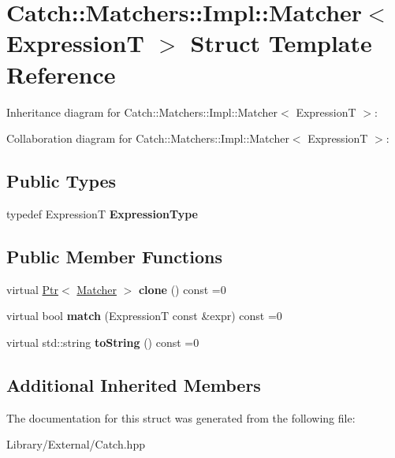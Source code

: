 \hypertarget{struct_catch_1_1_matchers_1_1_impl_1_1_matcher}{}\section{Catch\+:\+:Matchers\+:\+:Impl\+:\+:Matcher$<$ Expression\+T $>$ Struct Template Reference}
\label{struct_catch_1_1_matchers_1_1_impl_1_1_matcher}


Inheritance diagram for Catch\+:\+:Matchers\+:\+:Impl\+:\+:Matcher$<$ Expression\+T $>$\+:


Collaboration diagram for Catch\+:\+:Matchers\+:\+:Impl\+:\+:Matcher$<$ Expression\+T $>$\+:
\subsection*{Public Types}
\begin{DoxyCompactItemize}
\item 
\hypertarget{struct_catch_1_1_matchers_1_1_impl_1_1_matcher_a7f5068cbacd1eed06cf243e63446e7e1}{}typedef Expression\+T {\bfseries Expression\+Type}\label{struct_catch_1_1_matchers_1_1_impl_1_1_matcher_a7f5068cbacd1eed06cf243e63446e7e1}

\end{DoxyCompactItemize}
\subsection*{Public Member Functions}
\begin{DoxyCompactItemize}
\item 
\hypertarget{struct_catch_1_1_matchers_1_1_impl_1_1_matcher_a9d31e5018fea24efa08c3cbf5aa4475d}{}virtual \hyperlink{class_catch_1_1_ptr}{Ptr}$<$ \hyperlink{struct_catch_1_1_matchers_1_1_impl_1_1_matcher}{Matcher} $>$ {\bfseries clone} () const =0\label{struct_catch_1_1_matchers_1_1_impl_1_1_matcher_a9d31e5018fea24efa08c3cbf5aa4475d}

\item 
\hypertarget{struct_catch_1_1_matchers_1_1_impl_1_1_matcher_a8c1c5511ce1f3738a45e6901b558f583}{}virtual bool {\bfseries match} (Expression\+T const \&expr) const =0\label{struct_catch_1_1_matchers_1_1_impl_1_1_matcher_a8c1c5511ce1f3738a45e6901b558f583}

\item 
\hypertarget{struct_catch_1_1_matchers_1_1_impl_1_1_matcher_a091bcc37e589967d7e10fc7790d820e2}{}virtual std\+::string {\bfseries to\+String} () const =0\label{struct_catch_1_1_matchers_1_1_impl_1_1_matcher_a091bcc37e589967d7e10fc7790d820e2}

\end{DoxyCompactItemize}
\subsection*{Additional Inherited Members}


The documentation for this struct was generated from the following file\+:\begin{DoxyCompactItemize}
\item 
Library/\+External/Catch.\+hpp\end{DoxyCompactItemize}
